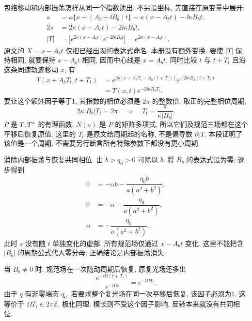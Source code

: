 \par\smallskip\noindent 包络移动和内部振荡怎样从同一个指数读出.\quad
不另设坐标, 先直接在原变量中展开:
\begin{align*}
s&=\kappa\{x-(A_b+\ii B_b)t\}
=\kappa(x-A_bt)-\ii\kappa B_bt,\\
2s&=2\kappa(x-A_bt)-2\ii\kappa B_bt,\\
|T|&=\left|e^{2\kappa(x-A_bt)}e^{-2\ii\kappa B_bt}\right|
=e^{2\kappa(x-A_bt)}.
\end{align*}
原文的 $X=x-A_bt$ 仅把已经出现的表达式命名, 本册没有额外变换. 要使 $|T|$ 保持相同, 就要保持 $x-A_bt$ 相同, 因而中心线是 $x=A_bt$. 同时比较 $t$ 与 $t+T_t$ 且沿这条同速轨迹移动 $x$, 有
\begin{align*}
T(x+A_bT_t,t+T_t)
&=e^{2\kappa[x+A_bT_t-A_b(t+T_t)]}
e^{-2\ii\kappa B_b(t+T_t)}\\
&=T(x,t)e^{-2\ii\kappa B_bT_t}.
\end{align*}
要让这个额外因子等于1, 其指数的相位必须是 $2\pi$ 的整数倍. 取正的完整相位周期,
\begin{equation*}
2\kappa|B_b|T_t=2\pi
\quad\Longrightarrow\quad
T_t=\dfrac{\pi}{\kappa|B_b|}.
\end{equation*}
$P$ 是 $T,{T}^{*}$ 的有理函数, $N(a)$ 是 $P$ 的矩阵多项式, 所以它们及规范三场都在这个平移后恢复原值. 这里的 $T_t$ 是原文给周期起的名称, 不是偏导数 $\partial_tT$. 本段证明了该值是一个周期, 不需要另行断言所有特殊参数下都没有更小周期.



\par\smallskip\noindent 消除内部振荡与恢复共同相位.\quad
由 $b>q_0>0$ 可除以 $b$. 将 $B_b$ 的表达式设为零, 逐步得到
\begin{align*}
0&=-\alpha b-\dfrac{\eta_0b}{a(a^2+b^2)},\\
0&=-\alpha-\dfrac{\eta_0}{a(a^2+b^2)},\\
\alpha&=-\dfrac{\eta_0}{a(a^2+b^2)}.
\end{align*}
此时 $s$ 没有随 $t$ 单独变化的虚部, 所有规范场仅通过 $x-A_bt$ 变化. 这里不能把含 $|B_b|$ 的周期公式代入零分母; 正确结论是内部振荡消失.

当 $B_b\ne0$ 时, 规范场在一次随动周期后恢复, 原复光场还多出
\begin{equation*}
\dfrac{e^{-\ii\Omega(t+T_t)}}{e^{-\ii\Omega t}}
=e^{-\ii\Omega T_t}.
\end{equation*}
由于 $q$ 有非零端态 $q_0$, 若要求整个复光场在同一次平移后恢复, 该因子必须为1. 这等价于 $\Omega T_t\in2\pi\mathbb Z$. 极化同理. 模长则不受这个因子影响, 反转本来就没有共同相位.

